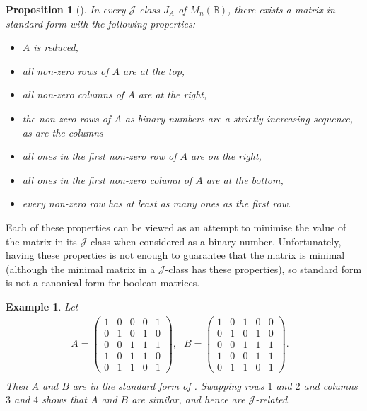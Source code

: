\documentclass[11pt]{article}
\newtheorem{prop}[thm]{Proposition}
\newtheorem{ex}[thm]{Example}
\numberwithin{equation}{section}
\newcommand{\B}{\mathbb{B}}
\newcommand{\Bn}{M_n(\B)}
\newcommand{\J}{\mathscr{J}}
\begin{document}
\begin{prop}[\cite{Breen1997aa}]
  In every $\J$-class $J_A$ of $\Bn$, there exists a matrix in \emph{standard
    form} with the following properties:
  \begin{itemize}
  \item{$A$ is reduced,}
  \item{all non-zero rows of $A$ are at the top,}
  \item{all non-zero columns of $A$ are at the right,}
  \item{the non-zero rows of $A$ as binary numbers are a strictly increasing
      sequence, as are the columns}
  \item{all ones in the first non-zero row of $A$ are on the right,}
  \item{all ones in the first non-zero column of $A$ are at the bottom,}
  \item{every non-zero row has at least as many ones as the first row.}
  \end{itemize}
\end{prop}

Each of these properties can be viewed as an attempt to minimise the value of
the matrix in its $\J$-class when considered as a binary number. Unfortunately,
having these properties is not enough to guarantee that the matrix is minimal
(although the minimal matrix in a $\J$-class has these properties), so standard
form is not a canonical form for boolean matrices.

\begin{ex}
Let
\begin{align*}
  A = \begin{pmatrix}
    1 & 0 & 0 & 0 & 1 \\
    0 & 1 & 0 & 1 & 0 \\
    0 & 0 & 1 & 1 & 1 \\
    1 & 0 & 1 & 1 & 0 \\
    0 & 1 & 1 & 0 & 1 
  \end{pmatrix}\text{,}&
  B = \begin{pmatrix}
    1 & 0 & 1 & 0 & 0 \\
    0 & 1 & 0 & 1 & 0 \\
    0 & 0 & 1 & 1 & 1 \\
    1 & 0 & 0 & 1 & 1 \\
    0 & 1 & 1 & 0 & 1 
  \end{pmatrix}.&\\
\end{align*}
Then $A$ and $B$ are in the standard form of
. Swapping rows $1$ and $2$ and columns $3$
and $4$ shows that $A$ and $B$ are similar, and hence are $\J$-related.
\end{ex}
\end{document}
